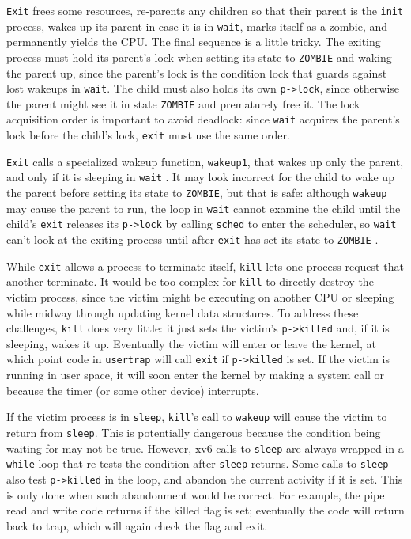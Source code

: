 \lstinline{Exit}
frees some resources,
re-parents any children so that their parent is
the \lstinline{init} process,
wakes up its parent in case it is in \lstinline{wait},
marks itself as a zombie, and permanently
yields the CPU.
The final sequence is a little tricky.
The exiting process must hold its parent's lock when
setting its state to \lstinline{ZOMBIE} and
waking the parent up, since the parent's lock
is the condition lock
that guards against lost wakeups in \lstinline{wait}. The child must also
holds its own \lstinline{p->lock}, since otherwise the parent
might see it in state \lstinline{ZOMBIE} and prematurely free it.
The lock acquisition order is important to avoid deadlock: since \lstinline{wait}
acquires the parent's lock before the child's lock,
\lstinline{exit} must use the same order.

\lstinline{Exit} calls a specialized wakeup function,
\lstinline{wakeup1}, that wakes up only the parent,
and only if it is sleeping in 
\lstinline{wait}
.
It may look incorrect for the child to wake up the parent
before setting its state to \lstinline{ZOMBIE}, 
but that is safe:
although
\lstinline{wakeup}
may cause the parent to run,
the loop in
\lstinline{wait}
cannot examine the child until the child's
\lstinline{exit}
releases its
\lstinline{p->lock}
by calling
\lstinline{sched}
to enter the scheduler,
so
\lstinline{wait}
can't look at
the exiting process until after
\lstinline{exit}
has set its state to
\lstinline{ZOMBIE}
.

While
\lstinline{exit} 
allows a process to terminate itself,
\lstinline{kill}
lets one process request that another terminate.
It would be too complex for
\lstinline{kill}
to directly destroy the victim process, since the victim
might be executing on another CPU or sleeping
while midway through updating kernel data structures.
To address these challenges, 
\lstinline{kill}
does very little: it just sets the victim's
\lstinline{p->killed}
and, if it is sleeping, wakes it up.
Eventually the victim will enter or leave the kernel,
at which point code in
\lstinline{usertrap}
will call
\lstinline{exit}
if
\lstinline{p->killed}
is set.
If the victim is running in user space, it will soon enter
the kernel by making a system call or because the timer (or
some other device) interrupts.

If the victim process is in
\lstinline{sleep},
\lstinline{kill}'s call to
\lstinline{wakeup}
will cause the victim to return from
\lstinline{sleep}.
This is potentially dangerous because 
the condition being waiting for may not be true.
However, xv6 calls to
\lstinline{sleep}
are always wrapped in a
\lstinline{while}
loop that re-tests the condition after
\lstinline{sleep}
returns.
Some calls to
\lstinline{sleep}
also test
\lstinline{p->killed}
in the loop, and abandon the current activity if it is set.
This is only done when such abandonment would be correct.
For example, the pipe read and write code
returns if the killed flag is set; eventually the
code will return back to trap, which will again
check the flag and exit.


